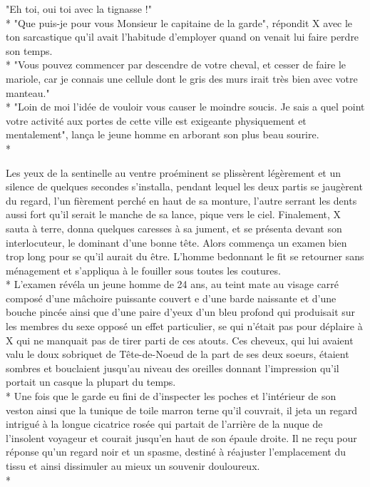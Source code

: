 \documentclass{book}
\begin{document}
"Eh toi, oui toi avec la tignasse !"\\*
"Que puis-je pour vous Monsieur le capitaine de la garde", répondit X avec le ton sarcastique qu'il avait l'habitude d'employer quand on venait lui faire perdre son temps.\\*
"Vous pouvez commencer par descendre de votre cheval, et cesser de faire le mariole, car je connais une cellule dont le gris des murs irait très bien avec votre manteau."\\*
"Loin de moi l'idée de vouloir vous causer le moindre soucis. Je sais a quel point votre activité aux portes de cette ville est exigeante physiquement et mentalement",
lança le jeune homme en arborant son plus beau sourire.\\*

Les yeux de la sentinelle au ventre proéminent se plissèrent légèrement et un silence de quelques secondes s'installa, pendant lequel les deux partis se jaugèrent du regard, l'un fièrement perché en haut de sa monture, l'autre serrant les dents aussi fort qu'il serait le manche de sa lance, pique vers le ciel. Finalement, X sauta à terre, donna quelques caresses à sa jument, et se présenta devant son interlocuteur, le dominant d'une bonne tête. 
Alors commença un examen bien trop long pour se qu'il aurait du être. L'homme bedonnant le fit se retourner sans ménagement et s'appliqua à le fouiller sous toutes les coutures.\\*
L'examen révéla un jeune homme de 24 ans, au teint mate au visage carré composé d'une mâchoire puissante couvert e d'une barde naissante et d'une bouche pincée ainsi que d'une paire d'yeux d'un bleu profond qui produisait sur les membres du sexe opposé un effet particulier, se qui n'était pas pour déplaire à X qui ne manquait pas de tirer parti de ces atouts. Ces cheveux, qui lui avaient valu le doux sobriquet de Tête-de-Noeud de la part de ses deux soeurs, étaient sombres et bouclaient jusqu'au niveau des oreilles donnant l'impression qu'il portait un casque la plupart du temps.\\*
Une fois que le garde eu fini de d'inspecter les poches et l’intérieur de son veston ainsi que la tunique de toile marron terne qu'il couvrait, il jeta un regard intrigué à la longue cicatrice rosée qui partait de l'arrière de la nuque de l'insolent voyageur et courait jusqu'en haut de son épaule droite. Il ne reçu pour réponse qu'un regard noir et un spasme, destiné à réajuster l'emplacement du tissu et ainsi dissimuler au mieux un souvenir douloureux.\\*
\end{document}
